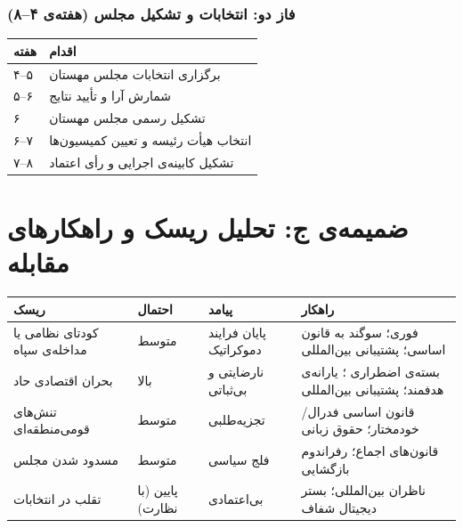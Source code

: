 \documentclass[12pt,a4paper,twoside,openany]{book}
\begin{document}
	\subsection*{فاز دو: انتخابات و تشکیل مجلس (هفته‌ی ۴--۸)}
	\begin{adjustbox}{max width=\linewidth}
		\begin{tabular}{@{}lp{10cm}@{}}
			\toprule
			\textbf{هفته} & \textbf{اقدام} \\
			\midrule
			۴--۵ & برگزاری انتخابات مجلس مهستان \\
			۵--۶ & شمارش آرا و تأیید نتایج \\
			۶ & تشکیل رسمی مجلس مهستان \\
			۶--۷ & انتخاب هیأت رئیسه و تعیین کمیسیون‌ها \\
			۷--۸ & تشکیل کابینه‌ی اجرایی و رأی اعتماد \\
			\bottomrule
		\end{tabular}
	\end{adjustbox}
	
	\chapter{ضمیمه‌ی ج: تحلیل ریسک و راهکارهای مقابله}
	\label{app:risk}
	
	\vspace{0.5\baselineskip}
	\noindent
	\begin{adjustbox}{max width=\linewidth}
		\begin{tabular}{@{}p{3.5cm}p{2cm}p{4cm}p{4cm}@{}}
			\toprule
			\textbf{ریسک} & \textbf{احتمال} & \textbf{پیامد} & \textbf{راهکار} \\
			\midrule
			\rowcolor{DangerBg}
			کودتای نظامی یا مداخله‌ی سپاه &
			متوسط &
			پایان فرایند دموکراتیک &
			\lr{SSR} فوری؛ سوگند به قانون اساسی؛ پشتیبانی بین‌المللی \\
			\addlinespace
			\rowcolor{DangerBg}
			بحران اقتصادی حاد &
			بالا &
			نارضایتی و بی‌ثباتی &
			بسته‌ی اضطراری \lr{IMF}؛ یارانه‌ی هدفمند؛ پشتیبانی بین‌المللی \\
			\addlinespace
			\rowcolor{WarningBg}
			تنش‌های قومی‌منطقه‌ای &
			متوسط &
			تجزیه‌طلبی &
			قانون اساسی فدرال/خودمختار؛ حقوق زبانی \\
			\addlinespace
			\rowcolor{WarningBg}
			مسدود شدن مجلس &
			متوسط &
			فلج سیاسی &
			قانون‌های اجماع؛ رفراندوم بازگشایی \\
			\addlinespace
			\rowcolor{NodeBg}
			تقلب در انتخابات &
			پایین (با نظارت) &
			بی‌اعتمادی &
			ناظران بین‌المللی؛ بستر دیجیتال شفاف \\
			\bottomrule
		\end{tabular}
	\end{adjustbox}
	
\end{document}
